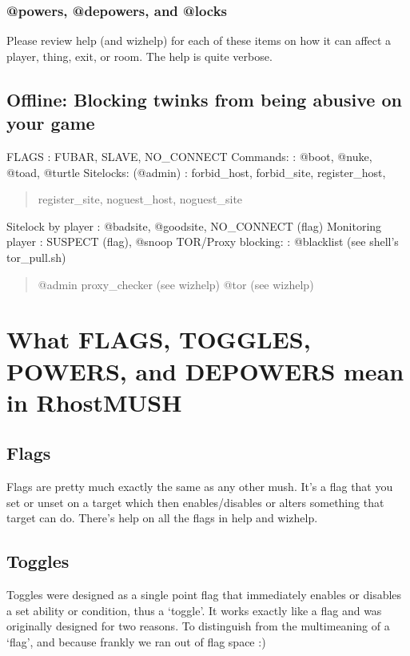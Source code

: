 \documentclass[letterpaper,10pt,english]{sphinxmanual}
\begin{document}
\subsection{@powers, @depowers, and @locks}
\label{\detokenize{06-security:powers-depowers-and-locks}}
\sphinxAtStartPar
Please review help (and wizhelp) for each of these items on how it can affect
a player, thing, exit, or room.  The help is quite verbose.


\section{Offline: Blocking twinks from being abusive on your game}
\label{\detokenize{06-security:offline-blocking-twinks-from-being-abusive-on-your-game}}
\sphinxAtStartPar
FLAGS                   : FUBAR, SLAVE, NO\_CONNECT
Commands:               : @boot, @nuke, @toad, @turtle
Sitelocks: (@admin)     : forbid\_host, forbid\_site, register\_host,
\begin{quote}

\sphinxAtStartPar
register\_site, noguest\_host, noguest\_site
\end{quote}

\sphinxAtStartPar
Sitelock by player      : @badsite, @goodsite, NO\_CONNECT (flag)
Monitoring player       : SUSPECT (flag), @snoop
TOR/Proxy blocking:     : @blacklist (see shell’s tor\_pull.sh)
\begin{quote}

\sphinxAtStartPar
@admin proxy\_checker (see wizhelp)
@tor (see wizhelp)
\end{quote}


\chapter{What FLAGS, TOGGLES, POWERS, and DEPOWERS mean in RhostMUSH}
\label{\detokenize{07-toggles:what-flags-toggles-powers-and-depowers-mean-in-rhostmush}}\label{\detokenize{07-toggles::doc}}

\section{Flags}
\label{\detokenize{07-toggles:flags}}
\sphinxAtStartPar
Flags are pretty much exactly the same as any other mush.  It’s a flag
that you set or unset on a target which then enables/disables or
alters something that target can do.  There’s help on all the flags
in help and wizhelp.


\section{Toggles}
\label{\detokenize{07-toggles:toggles}}
\sphinxAtStartPar
Toggles were designed as a single point flag that immediately enables
or disables a set ability or condition, thus a ‘toggle’.  It works
exactly like a flag and was originally designed for two reasons.  To
distinguish from the multi\sphinxhyphen{}meaning of a ‘flag’, and because frankly
we ran out of flag space :)
\end{document}
